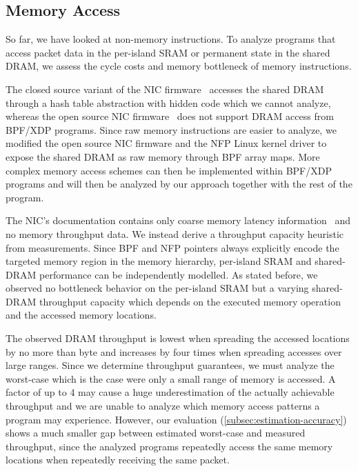 \documentclass[sigconf,screen,authordraft]{acmart}
\begin{document}
\subsection{Memory Access}
\label{subsec:memory-access}

So far, we have looked at non-memory instructions.
To analyze programs that access packet data in the per-island SRAM or permanent state in the shared DRAM, we assess the cycle costs and memory bottleneck of memory instructions.

The closed source variant of the NIC firmware~\cite{bpf-firmware} accesses the shared DRAM through a hash table abstraction with hidden code which we cannot analyze, whereas the open source NIC firmware~\cite{nic-firmware} does not support DRAM access from BPF/XDP programs.
Since raw memory instructions are easier to analyze, we modified the open source NIC firmware and the \ac{NFP} Linux kernel driver to expose the shared DRAM as raw memory through BPF array maps.
More complex memory access schemes can then be implemented within BPF/XDP programs and will then be analyzed by our approach together with the rest of the program.

The NIC's documentation contains only coarse memory latency information~\cite{joy-of-micro-c} and no memory throughput data.
We instead derive a throughput capacity heuristic from measurements.
Since BPF and NFP pointers always explicitly encode the targeted memory region in the memory hierarchy, per-island SRAM and shared-DRAM performance can be independently modelled.
As stated before, we observed no bottleneck behavior on the per-island SRAM but a varying shared-DRAM throughput capacity which depends on the executed memory operation and the accessed memory locations.

The observed DRAM throughput is lowest when spreading the accessed locations by no more than \unit[16]{byte} and increases by four times when spreading accesses over large ranges.
Since we determine throughput guarantees, we must analyze the worst-case which is the case were only a small range of memory is accessed.
A factor of up to 4 may cause a huge underestimation of the actually achievable throughput and we are unable to analyze which memory access patterns a program may experience.
However, our evaluation (\ref{subsec:estimation-accuracy}) shows a much smaller gap between estimated worst-case and measured throughput, since the analyzed programs repeatedly access the same memory locations when repeatedly receiving the same packet.
\end{document}

